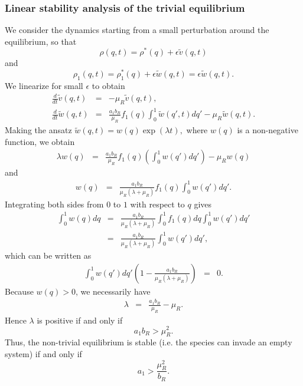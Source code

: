 \documentclass[8pt,a4paper]{article}
\begin{document}
\subsubsection*{Linear stability analysis of the trivial equilibrium}
We consider the dynamics starting from a small perturbation around the equilibrium, so that  $$\rho(q,t)=\rho^*(q)+\epsilon \tilde{v}(q,t)$$ and $$\rho_1(q,t)=\rho_1^*(q)+ \epsilon \tilde{w}(q,t)= \epsilon \tilde{w}(q,t).$$
We linearize for small $\epsilon$ to obtain
\begin{eqnarray*}
\frac{d}{dt} \tilde{v}(q,t) &=& - \mu_R \tilde{v}(q,t),\\
\frac{d}{dt} \tilde{w}(q,t) &=& \frac{a_1 b_R}{\mu_R}f_1(q) \int_0^1 \tilde{w}(q',t) dq' -\mu_R \tilde{w}(q,t).
\end{eqnarray*}
Making the ansatz $\tilde{w}(q,t)= w(q) \exp(\lambda t),$ where $w(q)$ is a non-negative function, we obtain
\begin{eqnarray*}
\lambda w(q)&=& \frac{a_1 b_R}{\mu_R}f_1(q) \left(\int_0^1 w(q') dq'\right) -\mu_R w(q) 
\end{eqnarray*}
and 
\begin{eqnarray*}
w(q) &=& \frac{a_1 b_R}{\mu_R (\lambda+\mu_R)}f_1(q) \int_0^1 w(q') dq'. 
\end{eqnarray*}
Integrating both sides from $0$ to $1$ with respect to $q$ gives
\begin{eqnarray*}
\int_0^1 w(q) dq &=& \frac{a_1 b_R}{\mu_R (\lambda+\mu_R)} \int_0^1 f_1(q) dq \int_0^1 w(q') dq'\\
&= &  \frac{a_1 b_R}{\mu_R (\lambda+\mu_R)} \int_0^1 w(q') dq',
\end{eqnarray*}
which can be written as
\begin{eqnarray*}
 \int_0^1 w(q') dq' \left(1-\frac{a_1 b_R}{\mu_R(\lambda+\mu_R)}\right) &=& 0.
\end{eqnarray*}
Because $w(q)>0$, we necessarily have
\begin{eqnarray*}
 \lambda &=& \frac{a_1 b_R}{\mu_R}-\mu_R.
\end{eqnarray*}
Hence $\lambda$ is positive if and only if
\begin{equation*}
a_1 b_R >\mu_R^2.
\end{equation*}
Thus, the non-trivial equilibrium is stable (i.e. the species can invade an empty system) if and only if
\begin{equation}
a_1> \frac{\mu_R^2}{b_R}.
\end{equation}
\end{document}
